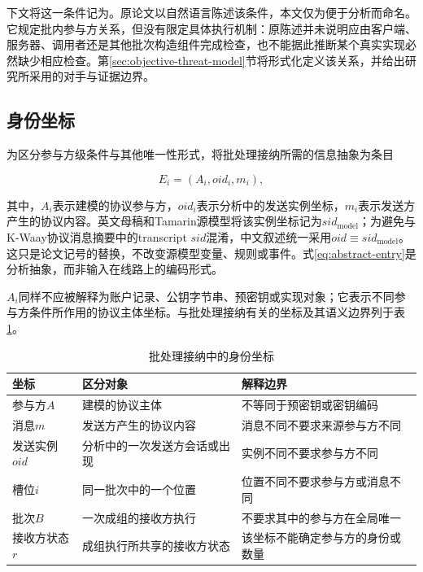 下文将这一条件记为\distinctparty。原论文以自然语言陈述该条件，本文仅为便于分析而命名。它规定批内参与方关系，但没有限定具体执行机制：原陈述并未说明应由客户端、服务器、调用者还是其他批次构造组件完成检查，也不能据此推断某个真实实现必然缺少相应检查。第\ref{sec:objective-threat-model}节将形式化定义该关系，并给出研究所采用的对手与证据边界。

\subsection{身份坐标}

为区分参与方级条件与其他唯一性形式，将批处理接纳所需的信息抽象为条目

\begin{equation}
  E_i=(A_i,\mathit{oid}_i,m_i),
  \label{eq:abstract-entry}
\end{equation}

其中，$A_i$表示建模的协议参与方，$\mathit{oid}_i$表示分析中的发送实例坐标，$m_i$表示发送方产生的协议内容。英文母稿和Tamarin源模型将该实例坐标记为$\mathit{sid}_{\mathrm{model}}$；为避免与K-Waay协议消息摘要中的transcript $\mathit{sid}$混淆，中文叙述统一采用$\mathit{oid}\equiv\mathit{sid}_{\mathrm{model}}$。这只是论文记号的替换，不改变源模型变量、规则或事件。式\eqref{eq:abstract-entry}是分析抽象，而非\kwaay 输入在线路上的编码形式。

$A_i$同样不应被解释为账户记录、公钥字节串、预密钥或实现对象；它表示不同参与方条件所作用的协议主体坐标。与批处理接纳有关的坐标及其语义边界列于表\ref{tab:identity-coordinates}。

\begin{table}[htbp]
  \centering
  \caption{批处理接纳中的身份坐标}
  \label{tab:identity-coordinates}
  \small
  \begin{tabularx}{\linewidth}{@{}lXX@{}}
    \toprule
    坐标 & 区分对象 & 解释边界 \\
    \midrule
    参与方$A$ & 建模的协议主体 & 不等同于预密钥或密钥编码 \\
    消息$m$ & 发送方产生的协议内容 & 消息不同不要求来源参与方不同 \\
    发送实例$\mathit{oid}$ & 分析中的一次发送方会话或出现 & 实例不同不要求参与方不同 \\
    槽位$i$ & 同一批次中的一个位置 & 位置不同不要求参与方或消息不同 \\
    批次$B$ & 一次成组的接收方执行 & 不要求其中的参与方在全局唯一 \\
    接收方状态$r$ & 成组执行所共享的接收方状态 & 该坐标不能确定参与方的身份或数量 \\
    \bottomrule
  \end{tabularx}
\end{table}

